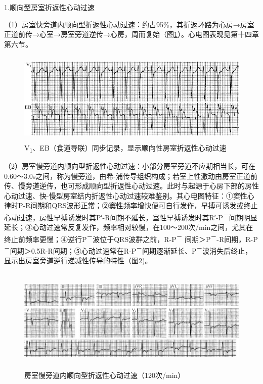 1.顺向型房室折返性心动过速

（1）房室快旁道内顺向型折返性心动过速：约占95\%，其折返环路为心房→房室正道前传→心室→房室旁道逆传→心房，周而复始（图\ref{fig29-4}）。心电图表现见第十四章第六节。

\begin{figure}[!htbp]
 \centering
 \includegraphics[width=5.04167in,height=1.73958in]{./images/Image00488.jpg}
 \captionsetup{justification=centering}
 \caption{V\textsubscript{1}、EB（食道导联）同步记录，显示顺向性房室折返性心动过速}
 \label{fig29-4}
  \end{figure} 


（2）房室慢旁道内顺向型折返性心动过速：小部分房室旁道不应期相当长，可在0.60～3.0s之间，称为慢旁道，由希-浦传导组织构成；若室上性激动由房室正道前传、慢旁道逆传，也可形成顺向型折返性心动过速。此时与起源于心房下部的房性心动过速、快-慢型房室结内折返性心动过速较难鉴别。其心电图特征：①窦性心律时P-R间期和QRS波形正常；②窦性频率增快便可自行发作，早搏可诱发或终止心动过速，房性早搏诱发时其P′-R间期不延长，室性早搏诱发时其R′-P\textsuperscript{－}间期明显延长；③心动过速常反复发作，频率相对较慢，在100～200次/min之间，尤其在终止前频率更慢；④逆行P\textsuperscript{－}波位于QRS波群之前，R-P\textsuperscript{－} 间期＞P\textsuperscript{－}-R间期，R-P\textsuperscript{－}间期＞0.5R-R间期；⑤心动过速常在R-P\textsuperscript{－}间期逐渐延长、P\textsuperscript{－}波消失后终止，显示出房室旁道逆行递减性传导的特性（图\ref{fig29-5})。

\begin{figure}[!htbp]
 \centering
 \includegraphics[width=5.78125in,height=1.95833in]{./images/Image00489.jpg}
 \captionsetup{justification=centering}
 \caption{房室慢旁道内顺向型折返性心动过速（120次/min）}
 \label{fig29-5}
  \end{figure} 


